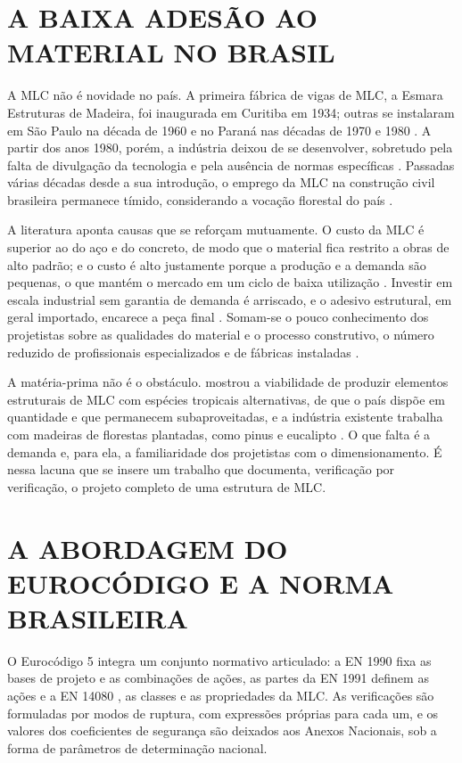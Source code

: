 \section{A BAIXA ADESÃO AO MATERIAL NO BRASIL}\label{sec:adesao-brasil}

A MLC não é novidade no país. A primeira fábrica de vigas de MLC, a Esmara
Estruturas de Madeira, foi inaugurada em Curitiba em 1934; outras se instalaram
em São Paulo na década de 1960 e no Paraná nas décadas de 1970 e 1980
\cite{pauli:2021}. A partir dos anos 1980, porém, a indústria deixou de se
desenvolver, sobretudo pela falta de divulgação da tecnologia e pela ausência de
normas específicas \cite{pauli:2021}. Passadas várias décadas desde a sua
introdução, o emprego da MLC na construção civil brasileira permanece tímido,
considerando a vocação florestal do país \cite{leite:2017}.

A literatura aponta causas que se reforçam mutuamente. O custo da MLC é
superior ao do aço e do concreto, de modo que o material fica restrito a obras
de alto padrão; e o custo é alto justamente porque a produção e a demanda são
pequenas, o que mantém o mercado em um ciclo de baixa utilização
\cite{pauli:2021}. Investir em escala industrial sem garantia de demanda é
arriscado, e o adesivo estrutural, em geral importado, encarece a peça final
\cite{leite:2017, pauli:2021}. Somam-se o pouco conhecimento dos projetistas
sobre as qualidades do material e o processo construtivo, o número reduzido de
profissionais especializados e de fábricas instaladas \cite{pauli:2021}.

A matéria-prima não é o obstáculo. \textcite{zangiacomo:2003} mostrou a
viabilidade de produzir elementos estruturais de MLC com espécies tropicais
alternativas, de que o país dispõe em quantidade e que permanecem
subaproveitadas, e a indústria existente trabalha com madeiras de florestas
plantadas, como pinus e eucalipto \cite{pauli:2021}. O que falta é a
demanda e, para ela, a familiaridade dos projetistas com o dimensionamento.
É nessa lacuna que se insere um trabalho que documenta, verificação por
verificação, o projeto completo de uma estrutura de MLC.

\section{A ABORDAGEM DO EUROCÓDIGO E A NORMA BRASILEIRA}\label{sec:eurocodigo-nbr}

O Eurocódigo 5 \cite{EN1995-1-1:2004} integra um conjunto normativo articulado:
a EN 1990 \cite{EN1990:2002} fixa as bases de projeto e as combinações de ações,
as partes da EN 1991 definem as ações e a EN 14080 \cite{EN14080:2013}, as
classes e as propriedades da MLC. As verificações são formuladas por modos de
ruptura, com expressões próprias para cada um, e os valores dos coeficientes de
segurança são deixados aos Anexos Nacionais, sob a forma de parâmetros de
determinação nacional.

